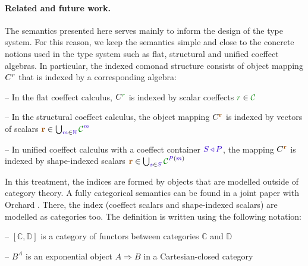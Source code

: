 \paragraph{Related and future work.}
The semantics presented here serves main\-ly to inform the design of the type system. For this 
reason, we keep the semantics simple and close to the concrete notions used in the type system
such as flat, structural and unified coeffect algebras. In particular, the indexed comonad 
structure consists of object mapping $C^{r}$ that is indexed by a corresponding algebra:

\begin{compactitem}
\item[--] In the flat coeffect calculus, $\ctyp{\cclrd{r}}{}$ is indexed by scalar coeffects $\cclrd{r} \in \C$
\item[--] In the structural coeffect calculus, the object mapping $\ctyp{\aclrd{\textbf{r}}}{}$ is 
  indexed by vectors of scalars $\aclrd{\textbf{r}} \in \bigcup_{\sclrd{m}\in \sclrd{\mathbb{N}}} \C^{\sclrd{m}}$
\item[--] In unified coeffect calculus with a coeffect container $\SH\,\sclrd{\triangleleft}\,\SP$,
  the mapping $\ctyp{\aclrd{\textbf{r}}}{}$ is indexed by shape-indexed scalars 
  $\aclrd{\textbf{r}} \in \bigcup_{\sclrd{s}\in \SH} \C^{\SP(\sclrd{m})}$
\end{compactitem}

\noindent
In this treatment, the indices are formed by objects that are modelled outside of category theory.
A fully categorical semantics can be found in a joint paper with Orchard \cite{coeffects-icfp14}. 
There, the index (coeffect scalars and shape-indexed scalars) are modelled as categories too.
The definition is written using the following notation:

\begin{compactitem}
\item[--] $[\mathbb{C}, \mathbb{D}]$ is a category of functors between categories $\mathbb{C}$ and $\mathbb{D}$
\item[--] $B^A$ is an exponential object $A \Rightarrow B$ in a Cartesian-closed category
\end{compactitem}

